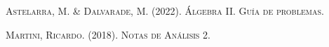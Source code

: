 \documentclass[a5paper,12pt,twoside]{book}
\begin{document}
    \pagestyle{fancy}
    \fancyhf{}
    \chead{\scriptsize \nouppercase \rightmark}
    \cfoot{\scriptsize \thepage}
    \renewcommand{\headrulewidth}{0pt}

    \frontmatter
    
    
    \renewcommand{\spanishappendixname}{Anexo}
    \tableofcontents

    \mainmatter
    
	
	
	
	
    
	
	
	
	
    
	
	
	
	
    
	
	
	
	
    
    
    
    
    
    
    \appendix
    

    \begin{thebibliography}{2}
         \textsc{Astelarra, M. \& Dalvarade, M. (2022). Álgebra II. Guía de problemas.}
        
         \textsc{Martini, Ricardo. (2018). Notas de Análisis 2.}
    \end{thebibliography}
\end{document}

